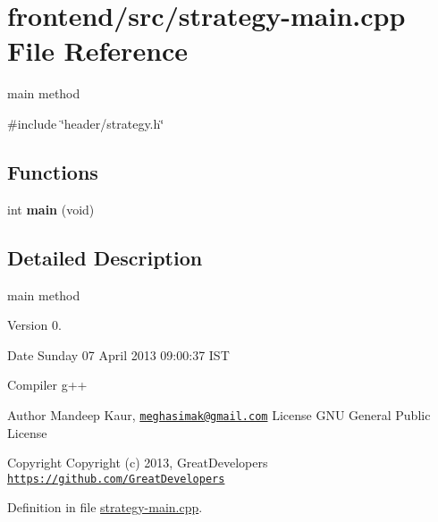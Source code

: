 \hypertarget{strategy-main_8cpp}{\section{frontend/src/strategy-\/main.cpp \-File \-Reference}
\label{d7/d69/strategy-main_8cpp}
}


main method  


{\ttfamily \#include \char`\"{}header/strategy.\-h\char`\"{}}\*
\subsection*{\-Functions}
\begin{DoxyCompactItemize}
\item 
\hypertarget{strategy-main_8cpp_a840291bc02cba5474a4cb46a9b9566fe}{int {\bfseries main} (void)}\label{d7/d69/strategy-main_8cpp_a840291bc02cba5474a4cb46a9b9566fe}

\end{DoxyCompactItemize}


\subsection{\-Detailed \-Description}
main method \begin{DoxyVersion}{\-Version}
0. 
\end{DoxyVersion}
\begin{DoxyDate}{\-Date}
\-Sunday 07 \-April 2013 09\-:00\-:37 \-I\-S\-T\par
 \-Compiler g++
\end{DoxyDate}
\begin{DoxyAuthor}{\-Author}
\-Mandeep \-Kaur, \href{mailto:meghasimak@gmail.com}{\tt meghasimak@gmail.\-com} \-License \-G\-N\-U \-General \-Public \-License 
\end{DoxyAuthor}
\begin{DoxyCopyright}{\-Copyright}
\-Copyright (c) 2013, \-Great\-Developers \href{https://github.com/GreatDevelopers}{\tt https\-://github.\-com/\-Great\-Developers} 
\end{DoxyCopyright}


\-Definition in file \hyperlink{strategy-main_8cpp_source}{strategy-\/main.\-cpp}.

